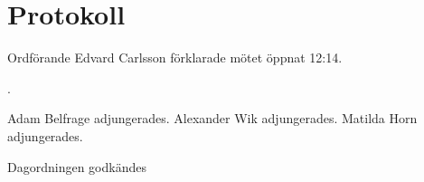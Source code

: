 \documentclass[10pt]{article}
\def\mo{Edvard Carlsson}
\begin{document}
\section*{Protokoll}
\begin{paragrafer}
Ordförande {\mo} förklarade mötet öppnat 12:14.

{\valavmo}

{\valavms}

{\valavj}

{\tosg}.

Adam Belfrage adjungerades.{}
Alexander Wik adjungerades.{}
Matilda Horn adjungerades.{}


Dagordningen godkändes


\ingaprot


\end{paragrafer}
\end{document}
